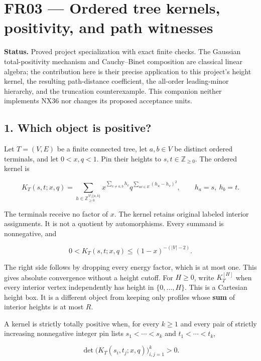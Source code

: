 \documentclass[
  11pt,
  a4paper,
]{report}
\begin{document}
\hypertarget{fr03-ordered-tree-kernels-positivity-and-path-witnesses}{%
\chapter{FR03 --- Ordered tree kernels, positivity, and path
witnesses}\label{fr03-ordered-tree-kernels-positivity-and-path-witnesses}}

\textbf{Status.} Proved project specialization with exact finite checks.
The Gaussian total-positivity mechanism and Cauchy--Binet composition
are classical linear algebra; the contribution here is their precise
application to this project's height kernel, the resulting path-distance
coefficient, the all-order leading-minor hierarchy, and the truncation
counterexample. This companion neither implements NX36 nor changes its
proposed acceptance units.

\hypertarget{which-object-is-positive}{%
\section{1. Which object is positive?}\label{which-object-is-positive}}

Let \(T=(V,E)\) be a finite connected tree, let \(a,b\in V\) be distinct
ordered terminals, and let \(0<x,q<1\). Pin their heights to
\(s,t\in\mathbb Z_{\ge0}\). The ordered kernel is

\[
K_T(s,t;x,q)=
\sum_{h\in\mathbb Z_{\ge0}^{V\setminus\{a,b\}}}
 x^{\sum_{v\ne a,b}h_v}
 q^{\sum_{uv\in E}(h_u-h_v)^2},\qquad h_a=s,\ h_b=t.
\]

The terminals receive no factor of \(x\). The kernel retains original
labeled interior assignments. It is not a quotient by automorphisms.
Every summand is nonnegative, and

\[
0<K_T(s,t;x,q)\le (1-x)^{-(|V|-2)}.
\]

The right side follows by dropping every energy factor, which is at most
one. This gives absolute convergence without a height cutoff. For
\(H\ge0\), write \(K_T^{[H]}\) when every interior vertex independently
has height in \(\{0,\ldots,H\}\). This is a Cartesian height box. It is
a different object from keeping only profiles whose \textbf{sum} of
interior heights is at most \(R\).

A kernel is strictly totally positive when, for every \(k\ge1\) and
every pair of strictly increasing nonnegative integer pin lists
\(s_1<\cdots<s_k\) and \(t_1<\cdots<t_k\),

\[
\det\bigl(K_T(s_i,t_j;x,q)\bigr)_{i,j=1}^k>0.
\]
\end{document}

